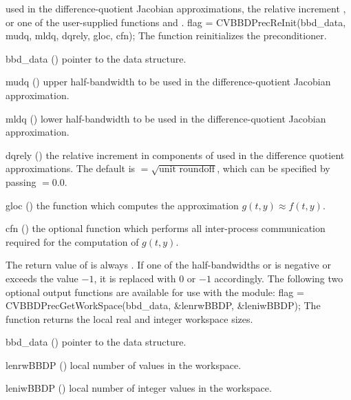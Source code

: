 used in the difference-quotient Jacobian approximations, the relative increment
, or one of the user-supplied functions  and .
{
  flag = CVBBDPrecReInit(bbd\_data, mudq, mldq, dqrely, gloc, cfn);
}
{
  The function  reinitializes the {\cvbbdpre} preconditioner.
}
{
  \begin{args}
  \item[bbd\_data] ()
    pointer to the {\cvbbdpre} data structure.
  \item[mudq] ()
    upper half-bandwidth to be used in the difference-quotient Jacobian approximation.
  \item[mldq] ()
    lower half-bandwidth to be used in the difference-quotient Jacobian approximation.
  \item[dqrely] ()
    the relative increment in components of  used in the difference quotient
    approximations.  The default is  $= \sqrt{\text{unit roundoff}}$,
    which can be specified by passing  $= 0.0$.
  \item[gloc] ()
    the {\C} function which computes the approximation $g(t,y) \approx f(t,y)$. 
  \item[cfn] ()
    the optional {\C} function which performs all inter-process communication required for
    the computation of $g(t,y)$.
  \end{args}
}
{
  The return value of  is always .
}
{
  If one of the half-bandwidths  or  is negative or
  exceeds the value $-1$, it is replaced with 0 or
  $-1$ accordingly.
}
The following two optional output functions are available for use with
the {\cvbbdpre} module:
{
  flag = CVBBDPrecGetWorkSpace(bbd\_data, \&lenrwBBDP, \&leniwBBDP);
}
{
  The function  returns the local
  {\cvbbdpre} real and integer workspace sizes.
}
{
  \begin{args}[lenrwBBDP]
  \item[bbd\_data] ()
    pointer to the {\cvbbdpre} data structure.
  \item[lenrwBBDP] ()
    local number of  values in the {\cvbbdpre} workspace.
  \item[leniwBBDP] ()
    local number of integer values in the {\cvbbdpre} workspace.
  \end{args}
}
